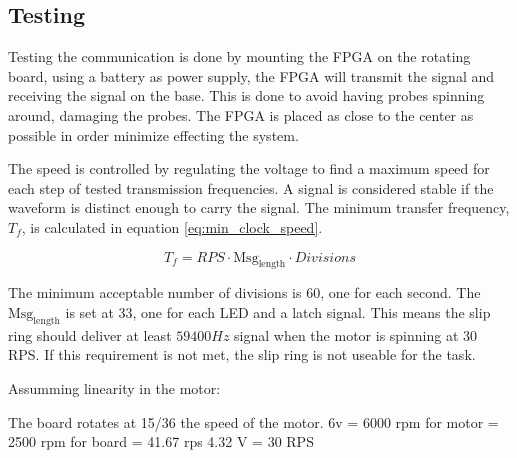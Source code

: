 \subsection{Testing}
Testing the communication is done by mounting the FPGA on the rotating board, using a battery as power supply, the FPGA will transmit the signal and receiving the signal on the base.
This is done to avoid having probes spinning around, damaging the probes.
The FPGA is placed as close to the center as possible in order minimize effecting the system.

The speed is controlled by regulating the voltage to find a maximum speed for each step of tested transmission frequencies.
A signal is considered stable if the waveform is distinct enough to carry the signal.
The minimum transfer frequency, $T_f$, is calculated in equation \ref{eq:min_clock_speed}.

\begin{equation}
  T_f = {RPS \cdot \text{Msg}_\text{length} \cdot Divisions }
 \label{eq:min_clock_speed}
\end{equation}

The minimum acceptable number of divisions is 60, one for each second.
The $\text{Msg}_\text{length}$ is set at 33, one for each LED and a latch signal.
This means the slip ring should deliver at least $59400 Hz$ signal when the motor is spinning at 30 RPS.
If this requirement is not met, the slip ring is not useable for the task.

Assumming linearity in the motor:

The board rotates at 15/36 the speed of the motor.
6v = 6000 rpm for motor = 2500 rpm for board = 41.67 rps
4.32 V = 30 RPS


